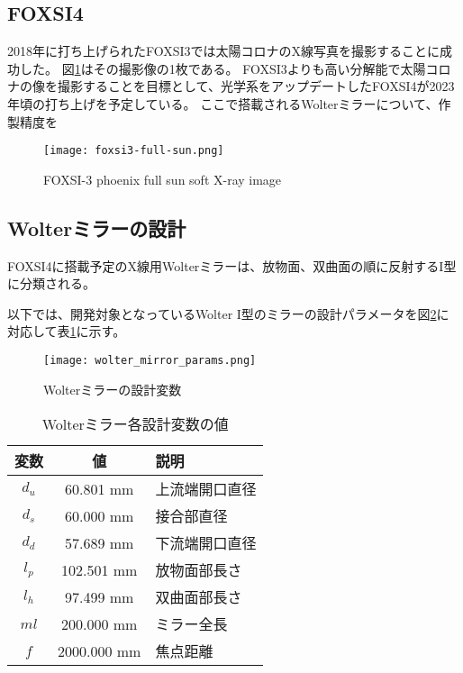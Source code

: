 \subsection{FOXSI4}
\label{chap1_foxsi}

2018年に打ち上げられたFOXSI3では太陽コロナのX線写真を撮影することに成功した。\cite{weko_20796_1}
図\ref{fig:foxsi-fullsun-image}はその撮影像の1枚である。
FOXSI3よりも高い分解能で太陽コロナの像を撮影することを目標として、光学系をアップデートしたFOXSI4が2023年頃の打ち上げを予定している。\cite{2019AGUFMSH31C3315V}
ここで搭載されるWolterミラーについて、作製精度を

\begin{figure}[h]
\centering
\texttt{[image: foxsi3-full-sun.png]}
\caption{FOXSI-3 phoenix full sun soft X-ray image \cite{weko_20796_1}}
\label{fig:foxsi-fullsun-image}
\end{figure}

\subsection{Wolterミラーの設計}
\label{chap1_wolter_arrangement}
FOXSI4に搭載予定のX線用Wolterミラーは、放物面、双曲面の順に反射するI型に分類される。

以下では、開発対象となっているWolter I型のミラーの設計パラメータを図\ref{fig:wolter_params}に対応して表\ref{tb:wolter_params}に示す。

\begin{figure}[h!]
\centering
\texttt{[image: wolter\_mirror\_params.png]}
\caption{Wolterミラーの設計変数}
\label{fig:wolter_params}
\end{figure}

\begin{table}[ht]
\begin{center}
  \begin{tabular}{|c|c|l|} \hline
    変数 & 値 & 説明 \\ \hline
    $d_u$ & 60.801 mm & 上流端開口直径 \\
    $d_s$ & 60.000 mm & 接合部直径 \\
    $d_d$ & 57.689 mm & 下流端開口直径 \\
    $l_p$ & 102.501 mm & 放物面部長さ \\
    $l_h$ & 97.499 mm & 双曲面部長さ \\
    $ml$ & 200.000 mm & ミラー全長 \\
    $f$ & 2000.000 mm & 焦点距離 \\ \hline
  \end{tabular}
  \caption{Wolterミラー各設計変数の値}
  \label{tb:wolter_params}
\end{center}
\end{table}

